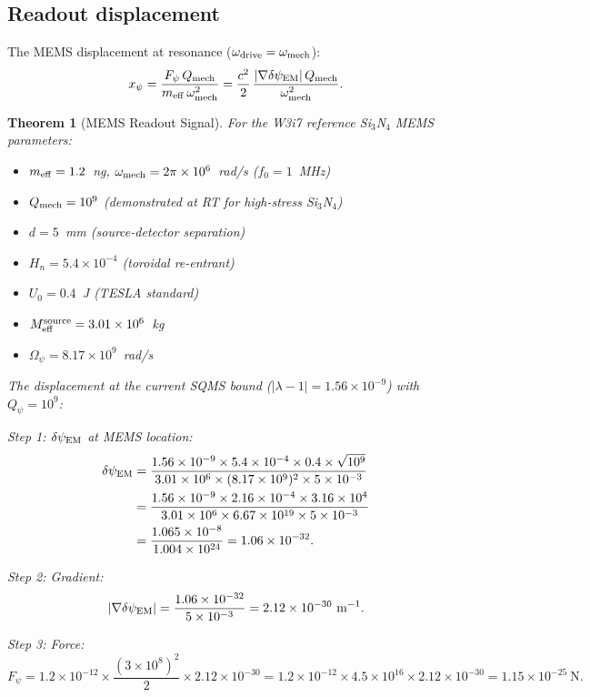 \documentclass[11pt]{article}
\newcommand{\lam}{\lambda}
\newcommand{\Opsi}{\Omega_\psi}
\newcommand{\Meff}{M_{\rm eff}}
\newcommand{\ee}[1]{\times 10^{#1}}
\newcommand{\Qpsi}{Q_\psi}
\newcommand{\Qmech}{Q_{\rm mech}}
\newcommand{\Heff}{H_n}
\newcommand{\lbone}{|\lam - 1|}
\newcommand{\dpsiEM}{\delta\psi_{\rm EM}}
\newtheorem{theorem}{Theorem}[section]
\theoremstyle{definition}
\theoremstyle{remark}
\begin{document}
\subsection{Readout displacement}

The MEMS displacement at resonance ($\omega_{\rm drive} = \omega_{\rm mech}$):
\begin{equation}
x_\psi = \frac{F_\psi\,\Qmech}{m_{\rm eff}\,\omega_{\rm mech}^2}
= \frac{c^2}{2}\,\frac{|\nabla\dpsiEM|\,\Qmech}{\omega_{\rm mech}^2}.
\label{eq:x_psi}
\end{equation}

\begin{theorem}[MEMS Readout Signal]
\label{thm:mems_signal}
For the W3i7 reference Si$_3$N$_4$ MEMS parameters:
\begin{itemize}[nosep]
\item $m_{\rm eff} = 1.2$~ng, $\omega_{\rm mech} = 2\pi\ee{6}$~rad/s
  ($f_0 = 1$~MHz)
\item $\Qmech = 10^9$ (demonstrated at RT for high-stress Si$_3$N$_4$)
\item $d = 5$~mm (source-detector separation)
\item $\Heff = 5.4\ee{-4}$ (toroidal re-entrant)
\item $U_0 = 0.4$~J (TESLA standard)
\item $\Meff^{\rm source} = 3.01\ee{6}$~kg
\item $\Opsi = 8.17\ee{9}$~rad/s
\end{itemize}

The displacement at the current SQMS bound ($\lbone = 1.56\ee{-9}$)
with $\Qpsi = 10^9$:

Step 1: $\dpsiEM$ at MEMS location:
\begin{align}
\dpsiEM &= \frac{1.56\ee{-9}\times 5.4\ee{-4}\times 0.4\times
\sqrt{10^9}}{3.01\ee{6}\times(8.17\ee{9})^2\times 5\ee{-3}}
\nonumber\\
&= \frac{1.56\ee{-9}\times 2.16\ee{-4}\times 3.16\ee{4}}
{3.01\ee{6}\times 6.67\ee{19}\times 5\ee{-3}}
\nonumber\\
&= \frac{1.065\ee{-8}}{1.004\ee{24}}
= 1.06\ee{-32}.
\label{eq:dpsi_numerical}
\end{align}

Step 2: Gradient:
\begin{equation}
|\nabla\dpsiEM| = \frac{1.06\ee{-32}}{5\ee{-3}} = 2.12\ee{-30}~\text{m}^{-1}.
\end{equation}

Step 3: Force:
\begin{equation}
F_\psi = 1.2\ee{-12}\times\frac{(3\ee{8})^2}{2}\times 2.12\ee{-30}
= 1.2\ee{-12}\times 4.5\ee{16}\times 2.12\ee{-30}
= 1.15\ee{-25}~\text{N}.
\end{equation}


\end{theorem}
\end{document}
